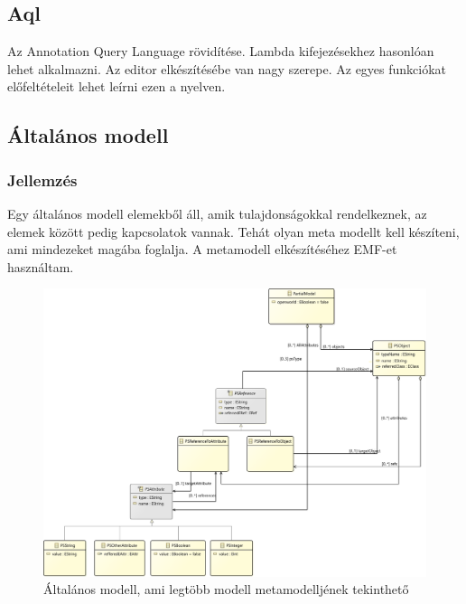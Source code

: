 \subsection{Aql}
Az Annotation Query Language rövidítése. Lambda kifejezésekhez hasonlóan lehet alkalmazni. 
Az editor elkészítésébe van nagy szerepe. Az egyes funkciókat előfeltételeit lehet leírni ezen a nyelven. 


\subsection{Általános modell}

\subsubsection{Jellemzés}
Egy általános modell elemekből áll, amik tulajdonságokkal rendelkeznek, az elemek között pedig kapcsolatok vannak. Tehát olyan meta modellt kell készíteni, ami mindezeket magába foglalja. A metamodell elkészítéséhez EMF-et használtam.

\begin{figure}[!ht]
	\centering
	\includegraphics[width=150mm]{figures/partialmodel01.pdf}
	\caption{Általános modell, ami legtöbb modell metamodelljének tekinthető} 
	\label{model}
\end{figure}

